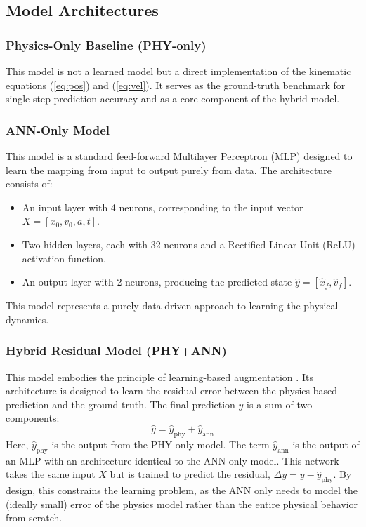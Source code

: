\documentclass[conference]{IEEEtran}
\begin{document}
\subsection{Model Architectures}


\subsubsection{Physics-Only Baseline (PHY-only)}
This model is not a learned model but a direct implementation of the kinematic equations (\ref{eq:pos}) and (\ref{eq:vel}). It serves as the ground-truth benchmark for single-step prediction accuracy and as a core component of the hybrid model.

\subsubsection{ANN-Only Model}
This model is a standard feed-forward Multilayer Perceptron (MLP) designed to learn the mapping from input to output purely from data. The architecture consists of:
\begin{itemize}
    \item An input layer with 4 neurons, corresponding to the input vector $X = [x_0, v_0, a, t]$.
    \item Two hidden layers, each with 32 neurons and a Rectified Linear Unit (ReLU) activation function.
    \item An output layer with 2 neurons, producing the predicted state $\hat{y} = [\hat{x}_f, \hat{v}_f]$.
\end{itemize}
This model represents a purely data-driven approach to learning the physical dynamics.

\subsubsection{Hybrid Residual Model (PHY+ANN)}
This model embodies the principle of learning-based augmentation \cite{b8}. Its architecture is designed to learn the residual error between the physics-based prediction and the ground truth. The final prediction $\hat{y}$ is a sum of two components:
$$\hat{y} = \hat{y}_{\text{phy}} + \hat{y}_{\text{ann}}$$
Here, $\hat{y}_{\text{phy}}$ is the output from the PHY-only model. The term $\hat{y}_{\text{ann}}$ is the output of an MLP with an architecture identical to the ANN-only model. This network takes the same input $X$ but is trained to predict the residual, $\Delta y = y - \hat{y}_{\text{phy}}$. By design, this constrains the learning problem, as the ANN only needs to model the (ideally small) error of the physics model rather than the entire physical behavior from scratch.
\end{document}

